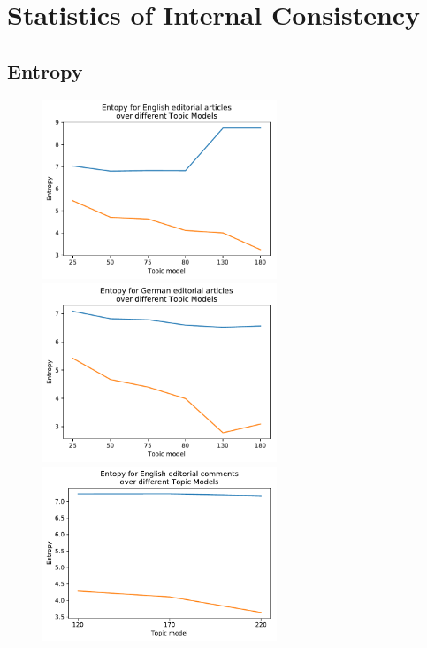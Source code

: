 \chapter{Statistics of Internal Consistency}

\section{Entropy}
\begin{figure}[t]
	\begin{minipage}{0.5\textwidth}
	\centering
	\includegraphics[width=7cm]{gfx/Eval_IC/English_Editorial_Entropy.pdf}
	\end{minipage}
	\begin{minipage}{0.5\textwidth}
		\centering
		\includegraphics[width=7cm]{gfx/Eval_IC/German_Editorial_Entropy.pdf}
	\end{minipage}%
	\begin{minipage}{0.5\textwidth}
		\centering
		\includegraphics[width=7cm]{gfx/Eval_IC/Eng_comments_Entropy.pdf}

\end{minipage}
\end{figure}
